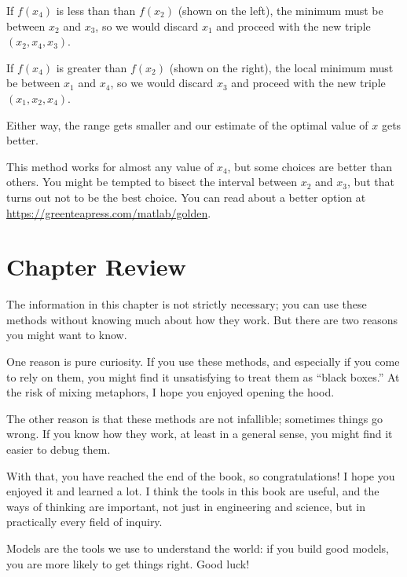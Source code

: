 If $f(x_4)$ is less than than $f(x_2)$ (shown on the left), the
minimum must be between $x_2$ and $x_3$, so we would discard $x_1$ and proceed with the new triple $(x_2, x_4, x_3)$.

If $f(x_4)$ is greater than $f(x_2)$ (shown on the right), the
local minimum must be between $x_1$ and $x_4$, so we would discard $x_3$ and proceed with the new triple $(x_1, x_2, x_4)$.

Either way, the range gets smaller and our estimate of the optimal value of $x$ gets better.

This method works for almost any value of $x_4$, but some choices
are better than others.  You might be tempted to bisect the interval between $x_2$ and $x_3$, but that turns out not to be the best choice.  You can read about a better option at \url{https://greenteapress.com/matlab/golden}.

\section{Chapter Review}

The information in this chapter is not strictly necessary; you can use these methods without knowing much about how they work.  But there are two reasons you might want to know.

One reason is pure curiosity.  If you use these methods, and especially if you come to rely on them, you might find it unsatisfying to treat them as ``black boxes.''  At the risk of mixing metaphors, I hope you enjoyed opening the hood.

The other reason is that these methods are not infallible; sometimes things go wrong.  If you know how they work, at least in a general sense, you might find it easier to debug them.

With that, you have reached the end of the book, so congratulations!  I hope you enjoyed it and learned a lot.  I think the tools in this book are useful, and the ways of thinking are important, not just in engineering and science, but in practically every field of inquiry.

Models are the tools we use to understand the world: if you build good models, you are more likely to get things right.  Good luck!
